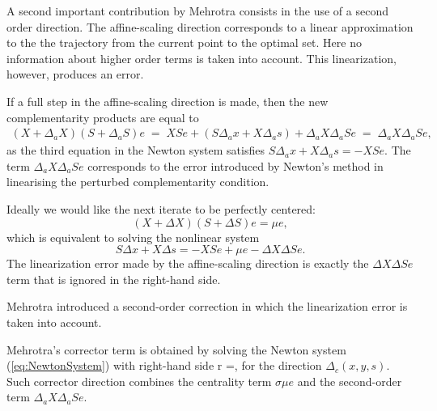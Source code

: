 
A second important contribution by Mehrotra consists in the 
use of a second order direction. The affine-scaling direction 
corresponds to a linear approximation to the the trajectory from 
the current point to the optimal set. Here no information about 
higher order terms is taken into account. This linearization, 
however, produces an error.


If a full step in the affine-scaling direction is made, then 
the new complementarity products are equal to
%
\begin{eqnarray*}
  (X + \Delta_a X) (S + \Delta_a S) e 
   \;=\; XSe + (S \Delta_a x + X \Delta_a s) + \Delta_a X \Delta_a S e
   \;=\; \Delta_a X \Delta_a S e,
\end{eqnarray*}
%
as the third equation in the Newton system satisfies 
$S \Delta_a x + X \Delta_a s = -XSe.$
%
The term $\Delta_a X \Delta_a S e$ corresponds to the error introduced
by Newton's method in linearising the perturbed complementarity condition.


Ideally we would like the next iterate to be perfectly centered: 
\[
  (X+\Delta X)(S+\Delta S)e=\mu e,
\]
which is equivalent to solving the nonlinear system
\[
  S\Delta x + X\Delta s = -XSe +\mu e - \Delta X\Delta Se.
\]
The linearization error made by the affine-scaling direction is exactly 
the $\Delta X\Delta Se$ term that is ignored in the right-hand side.


Mehrotra introduced a second-order correction in which the 
linearization error is taken into account. 

Mehrotra's corrector term is obtained by solving the Newton system 
(\ref{eq:NewtonSystem}) with right-hand side
\be \label{eq:MehrotraRhs}
r =,
\ee
for the direction $\Delta_c (x,y,s)$.
Such corrector direction combines the centrality term $\sigma \mu e$
and the second-order term $\Delta_a X\Delta_a Se$.

